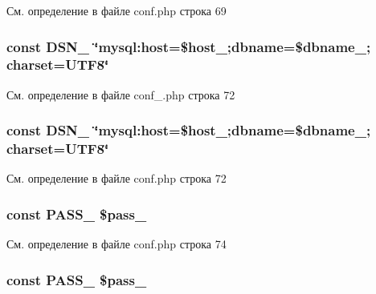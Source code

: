 См. определение в файле conf.\-php строка 69

\hypertarget{group___d_b__1_ga8ed489df371f2fa8bb344efb8d65bc9c}{
\subsubsection[{D\-S\-N\-\_\-1}]{\setlength{\rightskip}{0pt plus 5cm}const D\-S\-N\-\_ \char`\"{}mysql\-:host=\$host\-\_;dbname=\$dbname\-\_; charset=U\-T\-F8\char`\"{}}}\label{group___d_b__1_ga8ed489df371f2fa8bb344efb8d65bc9c}


См. определение в файле conf\-\_\-.\-php строка 72

\hypertarget{group___d_b__1_ga8ed489df371f2fa8bb344efb8d65bc9c}{
\subsubsection[{D\-S\-N\-\_\-1}]{\setlength{\rightskip}{0pt plus 5cm}const D\-S\-N\-\_ \char`\"{}mysql\-:host=\$host\-\_;dbname=\$dbname\-\_; charset=U\-T\-F8\char`\"{}}}\label{group___d_b__1_ga8ed489df371f2fa8bb344efb8d65bc9c}


См. определение в файле conf.\-php строка 72

\hypertarget{group___d_b__1_ga5a1b531167aa8e2f89c1f9bf9b32ddf3}{
\subsubsection[{P\-A\-S\-S\-\_\-1}]{\setlength{\rightskip}{0pt plus 5cm}const P\-A\-S\-S\-\_ \$pass\-\_}}\label{group___d_b__1_ga5a1b531167aa8e2f89c1f9bf9b32ddf3}


См. определение в файле conf.\-php строка 74

\hypertarget{group___d_b__1_ga5a1b531167aa8e2f89c1f9bf9b32ddf3}{
\subsubsection[{P\-A\-S\-S\-\_\-1}]{\setlength{\rightskip}{0pt plus 5cm}const P\-A\-S\-S\-\_ \$pass\-\_}}\label{group___d_b__1_ga5a1b531167aa8e2f89c1f9bf9b32ddf3}


